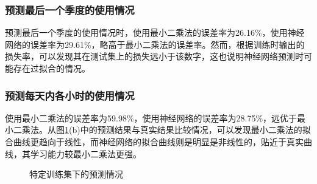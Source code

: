 \documentclass[CJK]{ctexart}
\begin{document}
\subsubsection{预测最后一个季度的使用情况}
预测最后一个季度的使用情况时，使用最小二乘法的误差率为26.16\%，使用神经网络的误差率为29.61\%，略高于最小二乘法的误差率。然而，根据训练时输出的损失率，可以发现其在测试集上的损失远小于该数字，这也说明神经网络预测时可能存在过拟合的情况。
\subsubsection{预测每天内各小时的使用情况}
使用最小二乘法的误差率为59.98\%，使用神经网络的误差率为28.75\%，远优于最小二乘法。从图\ref{fig:loss_2}(b)中的预测结果与真实结果比较情况，可以发现最小二乘法的拟合曲线更趋向于线性，而神经网络的拟合曲线则是明显是非线性的，贴近于真实曲线，其学习能力较最小二乘法更强。
\begin{figure}[htbp]
    \centering
    \centering
    \caption{特定训练集下的预测情况}
    \label{fig:loss_2}
\end{figure}
\end{document}
